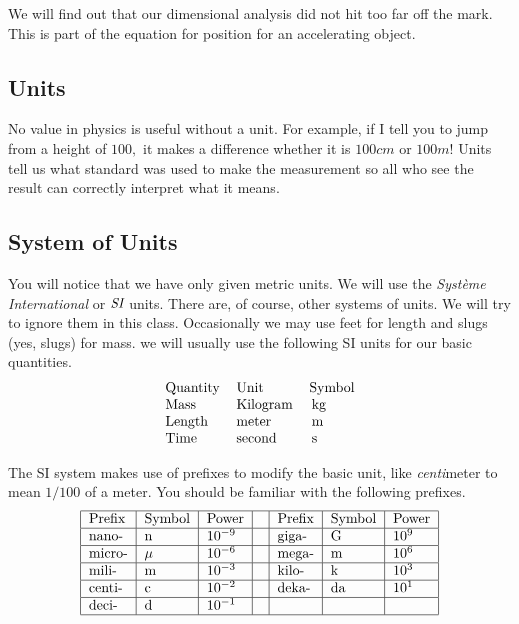 \documentclass[]{Book}
\begin{document}
We will find out that our dimensional analysis did not hit too far off the
mark. This is part of the equation for position for an accelerating object.

\subsection{Units}

No value in physics is useful without a unit. For example, if I tell you to
jump from a height of $100,$ it makes a difference whether it is $100\unit{cm%
}$ or $100\unit{m}!$ Units tell us what standard was used to make the
measurement so all who see the result can correctly interpret what it means.

\subsection{System of Units}

You will notice that we have only given metric units. We will use the \emph{%
	Syst\`{e}me International} or $\emph{SI}$ units. There are, of course, other
systems of units. We will try to ignore them in this class. Occasionally we
may use feet for length and slugs (yes, slugs) for mass. we will usually use
the following SI units for our basic quantities.%
\begin{equation*}
	\begin{tabular}{lll}
		Quantity & Unit & Symbol \\ 
		Mass & Kilogram & $\unit{kg}$ \\ 
		Length & meter & $\unit{m}$ \\ 
		Time & second & $\unit{s}$%
	\end{tabular}%
\end{equation*}

The SI system makes use of prefixes to modify the basic unit, like \emph{%
	centi}meter to mean $1/100$ of a meter. You should be familiar with the
following prefixes.\medskip 
\begin{equation*}
	\begin{tabular}{|l|l|l|l|l|l|l|}
		\hline
		Prefix & Symbol & Power &  & Prefix & Symbol & Power \\ \hline
		nano- & n & $10^{-9}$ &  & giga- & G & $10^{9}$ \\ \hline
		micro- & $\mu $ & $10^{-6}$ &  & mega- & m & $10^{6}$ \\ \hline
		mili- & m & $10^{-3}$ &  & kilo- & k & $10^{3}$ \\ \hline
		centi- & c & $10^{-2}$ &  & deka- & da & $10^{1}$ \\ \hline
		deci- & d & $10^{-1}$ &  &  &  &  \\ \hline
	\end{tabular}%
\end{equation*}
\end{document}
